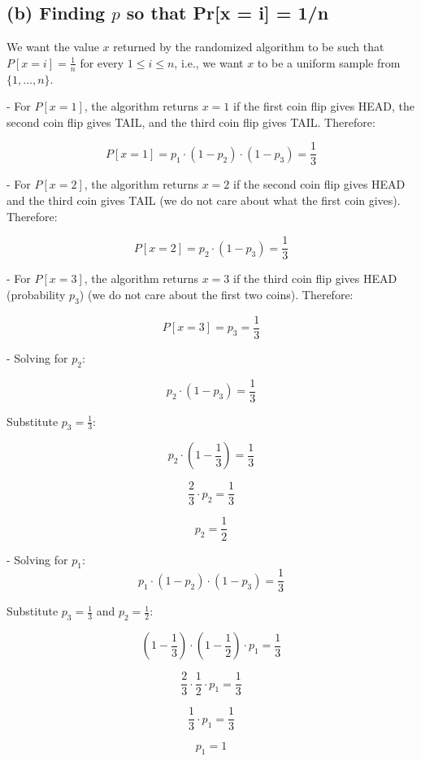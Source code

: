 \documentclass{article}
\begin{document}
\subsection*{(b) Finding \(p\) so that Pr[x = i] = 1/n}

We want the value \( x \) returned by the randomized algorithm to be such that \( P[x = i] = \frac{1}{n} \) for every \( 1 \leq i \leq n \), i.e., we want \( x \) to be a uniform sample from \( \{1, \ldots, n\} \). \\


- For \( P[x = 1] \), the algorithm returns \( x = 1 \) if the first coin flip gives HEAD, the second coin flip gives TAIL, and the third coin flip gives TAIL. Therefore:

\[
P[x = 1] = p_1 \cdot (1 - p_2) \cdot (1 - p_3) = \frac{1}{3}
\]

- For \( P[x = 2] \), the algorithm returns \( x = 2 \) if the second coin flip gives HEAD and the third coin gives TAIL (we do not care about what the first coin gives). Therefore:

\[
P[x = 2] = p_2 \cdot ( 1 - p_3) = \frac{1}{3}
\]

- For \( P[x = 3] \), the algorithm returns \( x = 3 \) if the third coin flip gives HEAD (probability \( p_3 \)) (we do not care about the first two coins). Therefore:

\[
P[x = 3] = p_3 = \frac{1}{3}
\]

- Solving for \( p_2 \):

\[
p_2 \cdot ( 1 - p_3) = \frac{1}{3}
\]

Substitute \( p_3 = \frac{1}{3} \):

\[
 p_2 \cdot \left(1 - \frac{1}{3}\right) = \frac{1}{3}
\]

\[
\frac{2}{3} \cdot p_2 = \frac{1}{3}
\]

\[
p_2 = \frac{1}{2}
\]

- Solving for \( p_1 \):
\[
 p_1 \cdot (1 - p_2) \cdot (1 - p_3) = \frac{1}{3}
 \]
 
Substitute \( p_3 = \frac{1}{3} \) and \( p_2 = \frac{1}{2} \):

\[
\left(1 - \frac{1}{3}\right) \cdot \left(1 - \frac{1}{2}\right) \cdot p_1 = \frac{1}{3}
\]

\[
\frac{2}{3} \cdot \frac{1}{2} \cdot p_1 = \frac{1}{3}
\]

\[
\frac{1}{3} \cdot p_1 = \frac{1}{3}
\]

\[
p_1 = 1
\]
\end{document}
